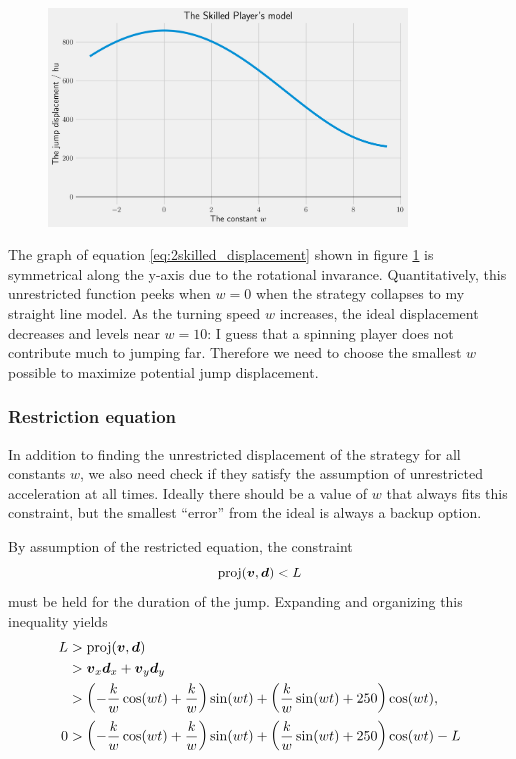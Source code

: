 \begin{figure}[H]
    \centering
    \includegraphics[width=0.85\textwidth]{assets/skilled_displacement.png}
    \caption{}
    \label{fig:skilled_displacement}

\end{figure}
The graph of equation \ref{eq:2skilled_displacement} shown in figure \ref{fig:skilled_displacement} is symmetrical along the y-axis due to the rotational invarance. Quantitatively, this unrestricted function peeks when $w=0$ when the strategy collapses to my straight line model. As the turning speed $w$ increases, the ideal displacement decreases and levels near $w=10$: I guess that a spinning player does not contribute much to jumping far. Therefore we need to choose the smallest $w$ possible to maximize potential jump displacement.

\subsubsection{Restriction equation}
In addition to finding the unrestricted displacement of the strategy for all constants $w$, we also need check if they satisfy the assumption of unrestricted acceleration at all times. Ideally there should be a value of $w$ that always fits this constraint, but the smallest ``error'' from the ideal is always a backup option.

By assumption of the restricted equation, the constraint
\[
    \text{proj}(\boldsymbol{v}, \boldsymbol{d}) < L
\]
must be held for the duration of the jump. Expanding and organizing this inequality yields
\begin{align*}
    L &> \text{proj}(\boldsymbol{v}, \boldsymbol{d})\\
    &> \boldsymbol{v}_x \boldsymbol{d}_x + \boldsymbol{v}_y \boldsymbol{d}_y\\
    &> \left(-\frac{k}{w} \cos(wt) + \frac{k}{w}\right) \sin(wt) + \left(\frac{k}{w} \sin(wt) + 250\right) \cos(wt),\\
    0 &> \left(-\frac{k}{w} \cos(wt) + \frac{k}{w}\right) \sin(wt) + \left(\frac{k}{w} \sin(wt) + 250\right) \cos(wt) - L
\end{align*}

